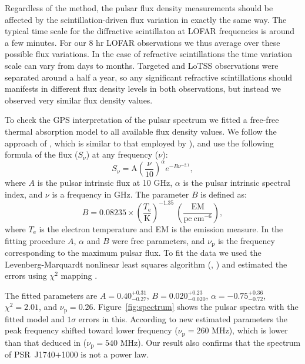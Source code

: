 \documentclass[manuscript]{aastex63}
\begin{document}
Regardless of the method, the pulsar flux density measurements should be affected by the scintillation-driven flux variation in exactly the same way. The typical time scale for the diffractive scintillaton at LOFAR frequencies is around a few minutes. For our 8 hr LOFAR observations we thus average over these possible flux variations. In the case of refractive scintillations the time variation scale can vary from days to months. Targeted and LoTSS observations were separated around a half a year, so any significant refractive scintillations should manifests in different flux density levels in both observations, but instead we observed very similar flux density values.

To check the GPS interpretation of the pulsar spectrum we fitted a free-free thermal absorption model to all available flux density values. We follow the approach of \citet{2015Lewandowski}, which is similar to that employed by \citet{2016Rajwade}), and use the following formula of the flux ($S_{\nu}$) at any frequency ($\nu$):
\begin{equation}
 S_{\nu} = \mathrm{A} \left( \frac{\nu}{10} \right)^{\alpha} e^{-B\nu^{-2.1}},
\end{equation}
where $A$ is the pulsar intrinsic flux at 10 GHz, $\alpha$ is the pulsar intrinsic spectral index, and $\nu$ is a frequency in GHz. The parameter $B$ is defined as:
\begin{equation}
B = 0.08235 \times \left(\frac{T_{\mathrm{e}}}{\mathrm{K}} \right)^{-1.35}~\left(\frac{\mathrm{EM}}{\mathrm{pc}~\mathrm{cm}^{-6}}\right),
\end{equation}
where $T_{\mathrm{e}}$ is the electron temperature and EM is the emission measure. In the fitting procedure $A$, $\alpha$ and $B$ were free parameters, and ${\nu}_{\mathrm{p}}$ is the frequency corresponding to the maximum pulsar flux. To fit the data we used the Levenberg-Marquardt nonlinear least squares algorithm (\citealt{1944Levenberg}, \citealt{1963Marquardt}) and estimated the errors using $\chi^2$ mapping \citep{1996Press}. 

The fitted parameters are $A = 0.40^{+0.31}_{-0.27}$, $B = 0.020^{+0.23}_{-0.020}$, $\alpha  = -0.75^{+0.36}_{-0.72}$, $\chi^2 = 2.01$, and $\nu_{\mathrm{p}} = 0.26$. Figure~\ref{fig:spectrum} shows the pulsar spectra with the fitted model and $1 \sigma$ errors in this. According to new estimated parameters the peak frequency shifted toward lower frequency ($\nu_{\mathrm{p}} = 260$ MHz), which is lower than that deduced in \citealt{2018Rozko} ($\nu_{\mathrm{p}} = 540$ MHz). Our result also confirms that the spectrum of PSR~J1740$+$1000 is not a power law. 
\end{document}
